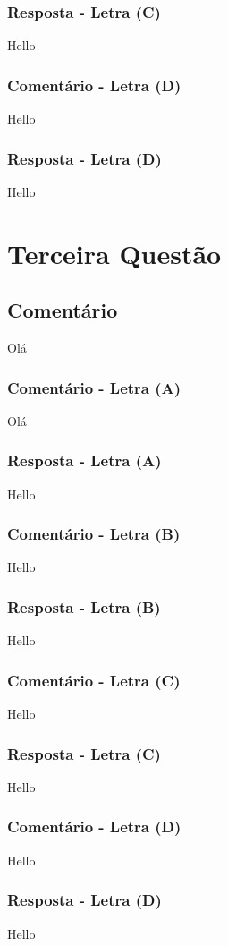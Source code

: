 \documentclass[12pt, a4paper]{article}
\begin{document}
		\subsubsection{Resposta - Letra (C)}
			Hello
		\subsubsection{Comentário - Letra (D)}
			Hello	
		\subsubsection{Resposta - Letra (D)}
			Hello
\section{Terceira Questão}
	\subsection{Comentário}
		Olá
		\subsubsection{Comentário - Letra (A)}
			Olá
		\subsubsection{Resposta - Letra (A)}
			Hello
		\subsubsection{Comentário - Letra (B)}
			Hello
		\subsubsection{Resposta - Letra (B)}
			Hello
		\subsubsection{Comentário - Letra (C)}
			Hello	
		\subsubsection{Resposta - Letra (C)}
			Hello
		\subsubsection{Comentário - Letra (D)}
			Hello	
		\subsubsection{Resposta - Letra (D)}
			Hello
\end{document}
